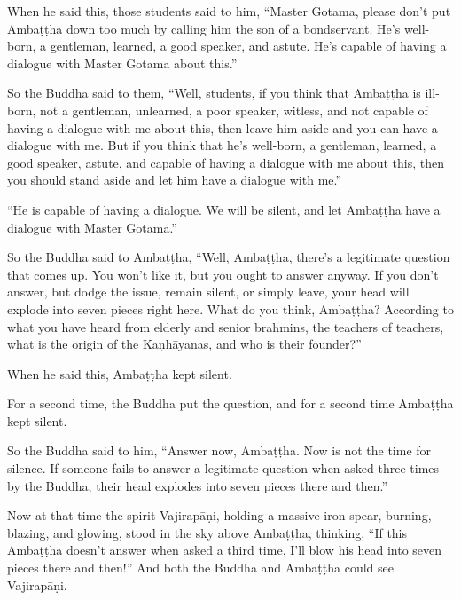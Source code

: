 \documentclass[12pt,openany]{book}%
\begin{document}
When he said this, those students said to him, “Master Gotama, please don’t put \textsanskrit{Ambaṭṭha} down too much by calling him the son of a bondservant. He’s well-born, a gentleman, learned, a good speaker, and astute. He’s capable of having a dialogue with Master Gotama about this.” 

So the Buddha said to them, “Well, students, if you think that \textsanskrit{Ambaṭṭha} is ill-born, not a gentleman, unlearned, a poor speaker, witless, and not capable of having a dialogue with me about this, then leave him aside and you can have a dialogue with me. But if you think that he’s well-born, a gentleman, learned, a good speaker, astute, and capable of having a dialogue with me about this, then you should stand aside and let him have a dialogue with me.” 

“He is capable of having a dialogue. We will be silent, and let \textsanskrit{Ambaṭṭha} have a dialogue with Master Gotama.” 

So the Buddha said to \textsanskrit{Ambaṭṭha}, “Well, \textsanskrit{Ambaṭṭha}, there’s a legitimate question that comes up. You won’t like it, but you ought to answer anyway. If you don’t answer, but dodge the issue, remain silent, or simply leave, your head will explode into seven pieces right here. What do you think, \textsanskrit{Ambaṭṭha}? According to what you have heard from elderly and senior brahmins, the teachers of teachers, what is the origin of the \textsanskrit{Kaṇhāyanas}, and who is their founder?” 

When he said this, \textsanskrit{Ambaṭṭha} kept silent. 

For a second time, the Buddha put the question, and for a second time \textsanskrit{Ambaṭṭha} kept silent. 

So the Buddha said to him, “Answer now, \textsanskrit{Ambaṭṭha}. Now is not the time for silence. If someone fails to answer a legitimate question when asked three times by the Buddha, their head explodes into seven pieces there and then.” 

Now at that time the spirit \textsanskrit{Vajirapāṇi}, holding a massive iron spear, burning, blazing, and glowing, stood in the sky above \textsanskrit{Ambaṭṭha}, thinking, “If this \textsanskrit{Ambaṭṭha} doesn’t answer when asked a third time, I’ll blow his head into seven pieces there and then!” And both the Buddha and \textsanskrit{Ambaṭṭha} could see \textsanskrit{Vajirapāṇi}. 
\end{document}
